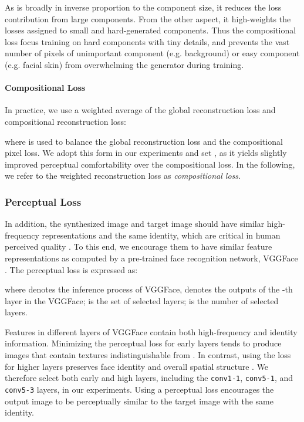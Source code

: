 \documentclass[journal]{IEEEtran}
\begin{document}
As  is broadly in inverse proportion to the component size, it reduces the loss contribution from large components. From the other aspect, it high-weights the losses assigned to small and hard-generated components. Thus the compositional loss focus training on hard components with tiny details, and prevents the vast number of pixels of unimportant component (e.g. background) or easy component (e.g. facial skin) from overwhelming the generator during training.

\paragraph{Compositional Loss} In practice, we use a weighted average of the global reconstruction loss and compositional reconstruction loss:

where  is used to balance the global reconstruction loss and the compositional pixel loss. 
We adopt this form in our experiments and set , as it yields slightly improved perceptual comfortability over the compositional loss. In the following, we refer to the weighted reconstruction loss as \textit{compositional loss}. 


\subsubsection{Perceptual Loss}
\label{sec:lid}

In addition, the synthesized image and target image should have similar high-frequency representations and the same identity, which are critical in human perceived quality \cite{Gao2016Biologically, Gao2018Blind}. To this end, we encourage them to have similar feature representations  \cite{Johnson2016Perceptual} as computed by a pre-trained face recognition network, VGGFace \cite{Parkhi15VGGFace}. The perceptual loss is expressed as:

where  denotes the inference process of VGGFace,  denotes the outputs of the -th layer in the VGGFace;  is the set of selected layers;  is the number of selected layers. 

Features in different layers of VGGFace contain both high-frequency and identity information. 
Minimizing the perceptual loss for early layers tends to produce images that contain textures indistinguishable from . In contrast, using the loss for higher layers preserves face identity and overall spatial structure \cite{Johnson2016Perceptual}. 
We therefore select both early and high layers, including the \texttt{conv1-1}, \texttt{conv5-1}, and \texttt{conv5-3} layers, in our experiments. 
Using a perceptual loss encourages the output image to be perceptually similar to the target image with the same identity.
\end{document}
